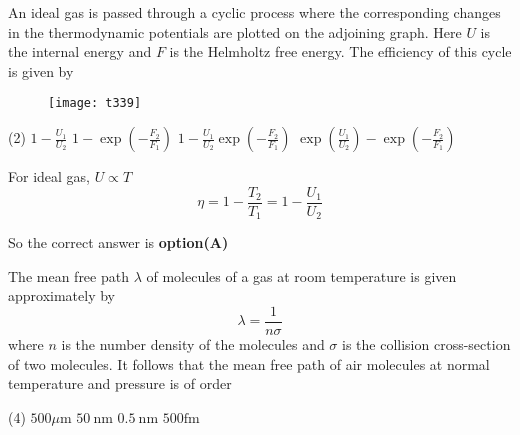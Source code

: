 \begin{questions}
\begin{minipage}{\textwidth}
	\question An ideal gas is passed through a cyclic process where the corresponding changes in the thermodynamic potentials are plotted on the adjoining graph. Here $U$ is the internal energy and $F$ is the Helmholtz free energy.
	The efficiency of this cycle is given by
\end{minipage}
\begin{figure}[H]
	\centering
	\texttt{[image: t339]}
\end{figure}
\begin{tasks}(2)
	\task[\textbf{A.}] $1-\frac{U_{1}}{U_{2}}$
	\task[\textbf{B.}] $1-\exp \left(-\frac{F_{2}}{F_{1}}\right)$
	\task[\textbf{C.}]   $1-\frac{U_{1}}{U_{2}} \exp \left(-\frac{F_{2}}{F_{1}}\right)$
	\task[\textbf{D.}]   $\exp \left(\frac{U_{1}}{U_{2}}\right)-\exp \left(-\frac{F_{2}}{F_{1}}\right)$
\end{tasks}
\begin{answer}
	For ideal gas, $U \propto T$
	$$
	\eta=1-\frac{T_{2}}{T_{1}}=1-\frac{U_{1}}{U_{2}}
	$$
	
	So the correct answer is \textbf{option(A)}
\end{answer}
\begin{minipage}{\textwidth}
	\question The mean free path $\lambda$ of molecules of a gas at room temperature is given approximately by
	$$
	\lambda=\frac{1}{n \sigma}
	$$
	where $n$ is the number density of the molecules and $\sigma$ is the collision cross-section of two molecules. It follows that the mean free path of air molecules at normal temperature and pressure is of order
\end{minipage}
\begin{tasks}(4)
	\task[\textbf{A.}] $500 \mu \mathrm{m}$
	\task[\textbf{B.}] $50 \mathrm{~nm}$
	\task[\textbf{C.}] $0.5 \mathrm{~nm}$
	\task[\textbf{D.}] $500 \mathrm{fm}$
\end{tasks}
\begin{answer}
	

\end{answer}
\end{questions}
